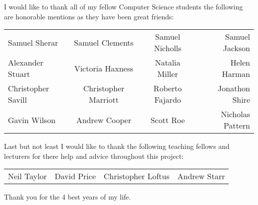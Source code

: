 \begin{center}
I would like to thank all of my fellow Computer Science students the following are honorable mentions as they have been great friends: 

\begin{tabular}{ l c c r }
Samuel Sherar & Samuel Clements & Samuel Nicholls & Samuel Jackson \\
Alexander Stuart & Victoria Haxness & Natalia Miller & Helen Harman \\
Christopher Savill & Christopher Marriott & Roberto Fajardo & Jonathon Shire \\
Gavin Wilson & Andrew Cooper & Scott Roe & Nicholas Pattern \\ 
\end{tabular}

Last but not least I would like to thank the following teaching fellows and lecturers for there help and advice throughout this project:

\begin{tabular}{ l c c r }
Neil Taylor & David Price & Christopher Loftus & Andrew Starr\\
\end{tabular}

Thank you for the 4 best years of my life.
\end{center}